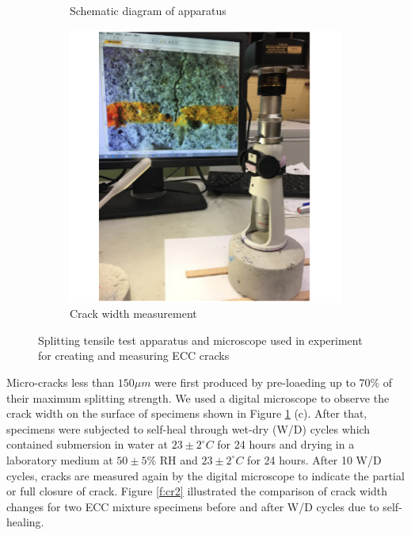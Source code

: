 \documentclass[11pt]{article}
\begin{document}
\begin{figure}[!h]
\begin{subfigure}{0.31\textwidth}
		\caption{Schematic diagram of apparatus}
		\end{subfigure}	
	\hspace{-0.10em}
		\begin{subfigure}{0.31\textwidth}
		\centering
		\includegraphics[width = \linewidth]{CR3}
		\caption{Crack width measurement}
		\end{subfigure}
		\caption{Splitting tensile test apparatus and microscope used in experiment for creating and measuring ECC cracks}\label{f:cr1}
	\end{figure} 


	Micro-cracks less than $150 \mu m$ were first produced by pre-loaeding up to 70\% of their maximum splitting strength. We used a digital microscope to observe the crack width on the surface of specimens shown in Figure \ref{f:cr1} (c). After that, specimens were subjected to self-heal through wet-dry (W/D) cycles which contained submersion in water at $23 \pm 2^\circ C$ for 24 hours and drying in a laboratory medium at $50 \pm 5\%$ RH and $23 \pm 2^\circ C$ for 24 hours. After 10 W/D cycles, cracks are measured again by the digital microscope to indicate the partial or full closure of crack. Figure \ref{f:cr2} illustrated the comparison of crack width changes for two ECC mixture specimens before and after W/D cycles due to self-healing. 
\end{document}
